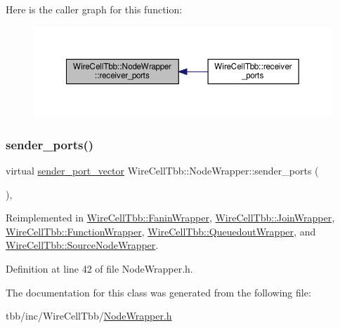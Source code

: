 Here is the caller graph for this function\+:
\nopagebreak
\begin{figure}[H]
\begin{center}
\leavevmode
\includegraphics[width=350pt]{class_wire_cell_tbb_1_1_node_wrapper_ac3c636904e4d3d1df0939906dd8853c7_icgraph}
\end{center}
\end{figure}
\mbox{\label{class_wire_cell_tbb_1_1_node_wrapper_a4ed2daeddbb2f75934759ac8f9a3ce8b}} 
\subsubsection{\texorpdfstring{sender\+\_\+ports()}{sender\_ports()}}
{\footnotesize\ttfamily virtual \hyperlink{namespace_wire_cell_tbb_a99272fef0f0c33dc9d4e6e8f777b2e6e}{sender\+\_\+port\+\_\+vector} Wire\+Cell\+Tbb\+::\+Node\+Wrapper\+::sender\+\_\+ports (\begin{DoxyParamCaption}{ }\end{DoxyParamCaption})\hspace{0.3cm}{\ttfamily [inline]}, {\ttfamily [virtual]}}



Reimplemented in \hyperlink{class_wire_cell_tbb_1_1_fanin_wrapper_a03e6bbc3d8adc82c6203a72d615c1ba7}{Wire\+Cell\+Tbb\+::\+Fanin\+Wrapper}, \hyperlink{class_wire_cell_tbb_1_1_join_wrapper_a5f533ec15abe6bbc05b852af154cb9a1}{Wire\+Cell\+Tbb\+::\+Join\+Wrapper}, \hyperlink{class_wire_cell_tbb_1_1_function_wrapper_a8b573eef2825b3f7920f7f358ddf914c}{Wire\+Cell\+Tbb\+::\+Function\+Wrapper}, \hyperlink{class_wire_cell_tbb_1_1_queuedout_wrapper_a3fbda43473c83b36b82fc53de70a9018}{Wire\+Cell\+Tbb\+::\+Queuedout\+Wrapper}, and \hyperlink{class_wire_cell_tbb_1_1_source_node_wrapper_acd2f3593b008c9570593412192b99b33}{Wire\+Cell\+Tbb\+::\+Source\+Node\+Wrapper}.



Definition at line 42 of file Node\+Wrapper.\+h.



The documentation for this class was generated from the following file\+:\begin{DoxyCompactItemize}
\item 
tbb/inc/\+Wire\+Cell\+Tbb/\hyperlink{_node_wrapper_8h}{Node\+Wrapper.\+h}\end{DoxyCompactItemize}
